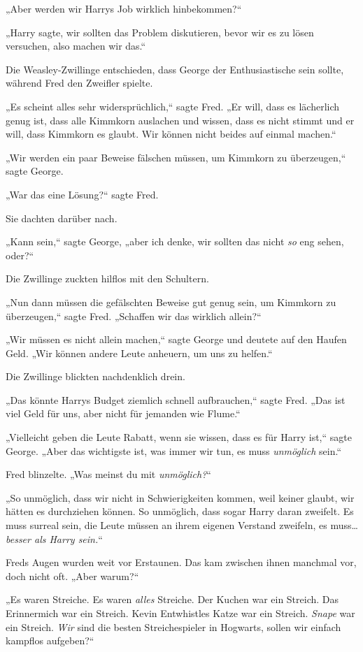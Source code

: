 {„Aber werden wir Harrys Job wirklich hinbekommen?“

„Harry sagte, wir sollten das Problem diskutieren, bevor wir es zu lösen versuchen, also machen wir das.“

Die Weasley-Zwillinge entschieden, dass George der Enthusiastische sein sollte, während Fred den Zweifler spielte.

„Es scheint alles sehr widersprüchlich,“ sagte Fred. „Er will, dass es lächerlich genug ist, dass alle Kimmkorn auslachen und wissen, dass es nicht stimmt und er will, dass Kimmkorn es glaubt. Wir können nicht beides auf einmal machen.“

„Wir werden ein paar Beweise fälschen müssen, um Kimmkorn zu überzeugen,“ sagte George.

„War das eine Lösung?“ sagte Fred.

Sie dachten darüber nach.

„Kann sein,“ sagte George, „aber ich denke, wir sollten das nicht \emph{so} eng sehen, oder?“

Die Zwillinge zuckten hilflos mit den Schultern.

„Nun dann müssen die gefälschten Beweise gut genug sein, um Kimmkorn zu überzeugen,“ sagte Fred. „Schaffen wir das wirklich allein?“

„Wir müssen es nicht allein machen,“ sagte George und deutete auf den Haufen Geld. „Wir können andere Leute anheuern, um uns zu helfen.“

Die Zwillinge blickten nachdenklich drein.

„Das könnte Harrys Budget ziemlich schnell aufbrauchen,“ sagte Fred. „Das ist viel Geld für uns, aber nicht für jemanden wie Flume.“

„Vielleicht geben die Leute Rabatt, wenn sie wissen, dass es für Harry ist,“ sagte George. „Aber das wichtigste ist, was immer wir tun, es muss \emph{unmöglich} sein.“

Fred blinzelte. „Was meinst du mit \emph{unmöglich?}“

„So unmöglich, dass wir nicht in Schwierigkeiten kommen, weil keiner glaubt, wir hätten es durchziehen können. So unmöglich, dass sogar Harry daran zweifelt. Es muss surreal sein, die Leute müssen an ihrem eigenen Verstand zweifeln, es muss… \emph{besser als Harry sein.}“

Freds Augen wurden weit vor Erstaunen. Das kam zwischen ihnen manchmal vor, doch nicht oft. „Aber warum?“

„Es waren Streiche. Es waren \emph{alles} Streiche. Der Kuchen war ein Streich. Das Erinnermich war ein Streich. Kevin Entwhistles Katze war ein Streich. \emph{Snape} war ein Streich. \emph{Wir} sind die besten Streichespieler in Hogwarts, sollen wir einfach kampflos aufgeben?“

}
